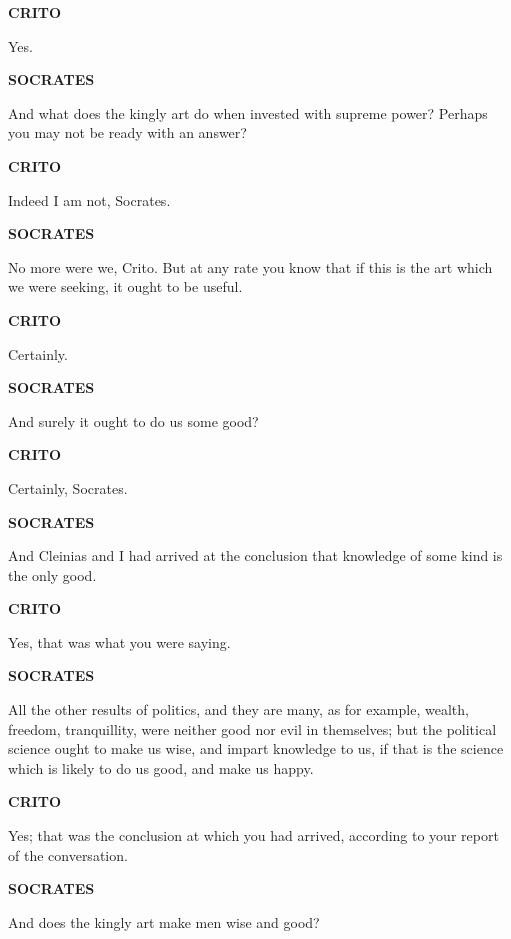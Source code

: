 \documentclass[11pt,letter]{article}
\begin{document}
\par \textbf{CRITO}
\par   Yes.

\par \textbf{SOCRATES}
\par   And what does the kingly art do when invested with supreme power? Perhaps you may not be ready with an answer?

\par \textbf{CRITO}
\par   Indeed I am not, Socrates.

\par \textbf{SOCRATES}
\par   No more were we, Crito. But at any rate you know that if this is the art which we were seeking, it ought to be useful.

\par \textbf{CRITO}
\par   Certainly.

\par \textbf{SOCRATES}
\par   And surely it ought to do us some good?

\par \textbf{CRITO}
\par   Certainly, Socrates.

\par \textbf{SOCRATES}
\par   And Cleinias and I had arrived at the conclusion that knowledge of some kind is the only good.

\par \textbf{CRITO}
\par   Yes, that was what you were saying.

\par \textbf{SOCRATES}
\par   All the other results of politics, and they are many, as for example, wealth, freedom, tranquillity, were neither good nor evil in themselves; but the political science ought to make us wise, and impart knowledge to us, if that is the science which is likely to do us good, and make us happy.

\par \textbf{CRITO}
\par   Yes; that was the conclusion at which you had arrived, according to your report of the conversation.

\par \textbf{SOCRATES}
\par   And does the kingly art make men wise and good?
\end{document}
